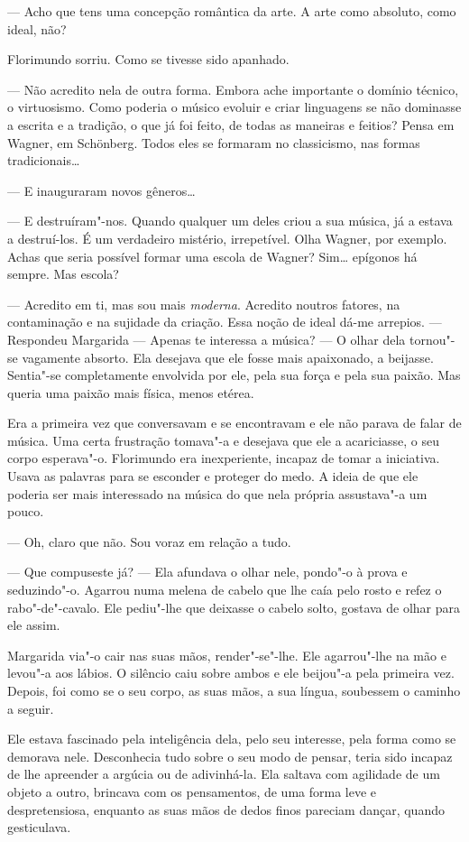 --- Acho que tens uma concepção romântica da arte. A arte como absoluto,
como ideal, não?

Florimundo sorriu. Como se tivesse sido apanhado.

--- Não acredito nela de outra forma. Embora ache importante o domínio
técnico, o virtuosismo. Como poderia o músico evoluir e criar linguagens
se não dominasse a escrita e a tradição, o que já foi feito, de todas as
maneiras e feitios? Pensa em Wagner, em Schönberg. Todos eles se
formaram no classicismo, nas formas tradicionais\ldots{}

--- E inauguraram novos gêneros\ldots{}

--- E destruíram"-nos. Quando qualquer um deles criou a sua música, já a
estava a destruí-los. É um verdadeiro mistério, irrepetível. Olha
Wagner, por exemplo. Achas que seria possível formar uma escola de
Wagner? Sim\ldots{} epígonos há sempre. Mas escola?

--- Acredito em ti, mas sou mais \emph{moderna}. Acredito noutros fatores, na
contaminação e na sujidade da criação. Essa noção de ideal dá-me
arrepios. --- Respondeu Margarida --- Apenas te interessa a música? --- O
olhar dela tornou"-se vagamente absorto. Ela desejava que ele fosse mais
apaixonado, a beijasse. Sentia"-se completamente envolvida por ele, pela
sua força e pela sua paixão. Mas queria uma paixão mais física, menos
etérea.

Era a primeira vez que conversavam e se encontravam e ele não parava de
falar de música. Uma certa frustração tomava"-a e desejava que ele a
acariciasse, o seu corpo esperava"-o. Florimundo era inexperiente,
incapaz de tomar a iniciativa. Usava as palavras para se esconder e
proteger do medo. A ideia de que ele poderia ser mais interessado na
música do que nela própria assustava"-a um pouco.

--- Oh, claro que não. Sou voraz em relação a tudo.

--- Que compuseste já? --- Ela afundava o olhar nele, pondo"-o à prova e
seduzindo"-o. Agarrou numa melena de cabelo que lhe caía pelo rosto e
refez o rabo"-de"-cavalo. Ele pediu"-lhe que deixasse o cabelo solto,
gostava de olhar para ele assim.

Margarida via"-o cair nas suas mãos, render"-se"-lhe. Ele agarrou"-lhe na
mão e levou"-a aos lábios. O silêncio caiu sobre ambos e ele beijou"-a
pela primeira vez. Depois, foi como se o seu corpo, as suas mãos, a sua
língua, soubessem o caminho a seguir.

Ele estava fascinado pela inteligência dela, pelo seu interesse, pela
forma como se demorava nele. Desconhecia tudo sobre o seu modo de
pensar, teria sido incapaz de lhe apreender a argúcia ou de adivinhá-la.
Ela saltava com agilidade de um objeto a outro, brincava com os
pensamentos, de uma forma leve e despretensiosa, enquanto as suas mãos
de dedos finos pareciam dançar, quando gesticulava.


